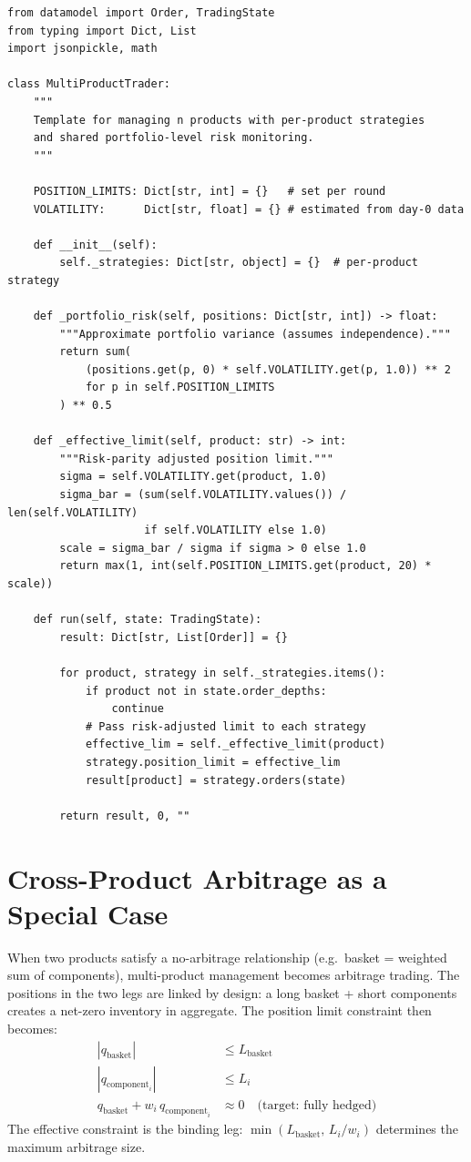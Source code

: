 \documentclass[12pt,a4paper,openany]{report}
\theoremstyle{definition}
\begin{document}
\begin{lstlisting}[caption={Multi-product trader skeleton for Rounds 1--5}]
from datamodel import Order, TradingState
from typing import Dict, List
import jsonpickle, math

class MultiProductTrader:
    """
    Template for managing n products with per-product strategies
    and shared portfolio-level risk monitoring.
    """

    POSITION_LIMITS: Dict[str, int] = {}   # set per round
    VOLATILITY:      Dict[str, float] = {} # estimated from day-0 data

    def __init__(self):
        self._strategies: Dict[str, object] = {}  # per-product strategy

    def _portfolio_risk(self, positions: Dict[str, int]) -> float:
        """Approximate portfolio variance (assumes independence)."""
        return sum(
            (positions.get(p, 0) * self.VOLATILITY.get(p, 1.0)) ** 2
            for p in self.POSITION_LIMITS
        ) ** 0.5

    def _effective_limit(self, product: str) -> int:
        """Risk-parity adjusted position limit."""
        sigma = self.VOLATILITY.get(product, 1.0)
        sigma_bar = (sum(self.VOLATILITY.values()) / len(self.VOLATILITY)
                     if self.VOLATILITY else 1.0)
        scale = sigma_bar / sigma if sigma > 0 else 1.0
        return max(1, int(self.POSITION_LIMITS.get(product, 20) * scale))

    def run(self, state: TradingState):
        result: Dict[str, List[Order]] = {}

        for product, strategy in self._strategies.items():
            if product not in state.order_depths:
                continue
            # Pass risk-adjusted limit to each strategy
            effective_lim = self._effective_limit(product)
            strategy.position_limit = effective_lim
            result[product] = strategy.orders(state)

        return result, 0, ""
\end{lstlisting}

\section{Cross-Product Arbitrage as a Special Case}

When two products satisfy a no-arbitrage relationship (e.g.\ basket = weighted sum of components), multi-product management becomes arbitrage trading. The positions in the two legs are linked by design: a long basket + short components creates a net-zero inventory in aggregate. The position limit constraint then becomes:
\begin{align}
  |q_{\text{basket}}| &\leq L_{\text{basket}} \\
  |q_{\text{component}_i}| &\leq L_i \\
  q_{\text{basket}} + w_i\, q_{\text{component}_i} &\approx 0 \quad \text{(target: fully hedged)}
\end{align}
The effective constraint is the binding leg: $\min(L_{\text{basket}},\, L_i / w_i)$ determines the maximum arbitrage size.
\end{document}

